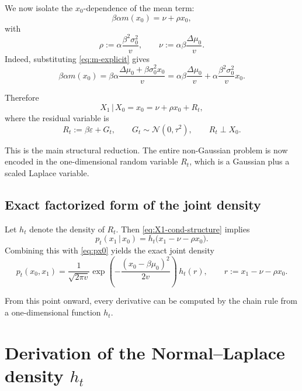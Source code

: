 \documentclass[11pt]{article}
\newcommand{\1}{\mathbf{1}}
\newcommand{\pt}{p_t}
\newcommand{\Normal}{\mathcal{N}}
\newcommand{\given}{\,|\,}
\theoremstyle{definition}
\begin{document}
We now isolate the \(x_0\)-dependence of the mean term:
\begin{equation}
\beta\alpha m(x_0)=\nu + \rho x_0,
\end{equation}
with
\begin{equation}
\label{eq:rho-nu-definitions}
\rho := \alpha\frac{\beta^2\sigma_0^2}{v},
\qquad
\nu := \alpha\beta\frac{\Delta\mu_0}{v}.
\end{equation}
Indeed, substituting \eqref{eq:m-explicit} gives
\begin{equation}
\beta\alpha m(x_0)=\beta\alpha\frac{\Delta\mu_0+\beta\sigma_0^2 x_0}{v}
=\alpha\beta\frac{\Delta\mu_0}{v} + \alpha\frac{\beta^2\sigma_0^2}{v}x_0.
\end{equation}

Therefore
\begin{equation}
\label{eq:X1-cond-structure}
X_1\given X_0=x_0 = \nu + \rho x_0 + R_t,
\end{equation}
where the residual variable is
\begin{equation}
\label{eq:Rt-definition}
R_t := \beta\varepsilon + G_t,
\qquad
G_t\sim \Normal(0,\tau^2),
\qquad
R_t \perp X_0.
\end{equation}

This is the main structural reduction. The entire non-Gaussian problem is now encoded in the one-dimensional random variable \(R_t\), which is a Gaussian plus a scaled Laplace variable.

\subsection{Exact factorized form of the joint density}

Let \(h_t\) denote the density of \(R_t\). Then \eqref{eq:X1-cond-structure} implies
\begin{equation}
\label{eq:conditional-density-via-residual}
\pt(x_1\given x_0)=h_t\big(x_1-\nu-\rho x_0\big).
\end{equation}
Combining this with \eqref{eq:px0} yields the exact joint density
\begin{equation}
\label{eq:joint-factorized-final}
\boxed{
\pt(x_0,x_1)=\frac{1}{\sqrt{2\pi v}}\exp\!\left(-\frac{(x_0-\beta\mu_0)^2}{2v}\right)\, h_t(r),
\qquad
r:=x_1-\nu-\rho x_0.
}
\end{equation}

From this point onward, every derivative can be computed by the chain rule from a one-dimensional function \(h_t\).

\section{Derivation of the Normal--Laplace density \(h_t\)}
\end{document}
